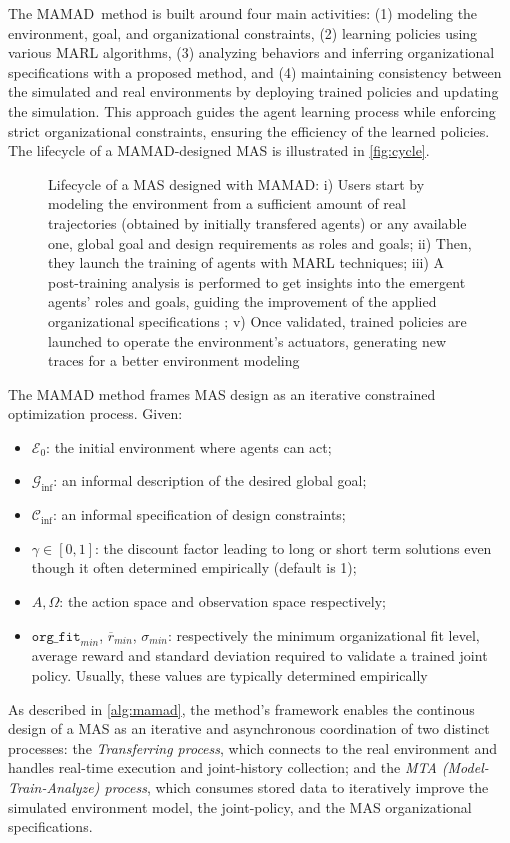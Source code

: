\documentclass[pdflatex,sn-mathphys-num]{sn-jnl}%
\theoremstyle{thmstyleone}%
\theoremstyle{thmstyletwo}%
\theoremstyle{thmstylethree}%
\begin{document}
The MAMAD~\footnotemark[1] method is built around four main activities: (1) modeling the environment, goal, and organizational constraints, (2) learning policies using various MARL algorithms, (3) analyzing behaviors and inferring organizational specifications with a proposed method, and (4) maintaining consistency between the simulated and real environments by deploying trained policies and updating the simulation. This approach guides the agent learning process while enforcing strict organizational constraints, ensuring the efficiency of the learned policies. The lifecycle of a MAMAD-designed MAS is illustrated in \autoref{fig:cycle}.
%
\begin{figure}[h!]
    \centering
    
    \caption{Lifecycle of a MAS designed with MAMAD: i) Users start by modeling the environment from a sufficient amount of real trajectories (obtained by initially transfered agents) or any available one, global goal and design requirements as roles and goals; \quad ii) Then, they launch the training of agents with MARL techniques; \quad iii) A post-training analysis is performed to get insights into the emergent agents' roles and goals, guiding the improvement of the applied organizational specifications ; \quad v) Once validated, trained policies are launched to operate the environment's actuators, generating new traces for a better environment modeling}
    \label{fig:cycle}
\end{figure}
%
The MAMAD method frames MAS design as an iterative constrained optimization process. Given:
\begin{itemize}
    \item $\mathcal{E}_0$: the initial environment where agents can act;
    \item $\mathcal{G}_{\text{inf}}$: an informal description of the desired global goal;
    \item $\mathcal{C}_{\text{inf}}$: an informal specification of design constraints;
    \item $\gamma \in [0,1]$: the discount factor leading to long or short term solutions even though it often determined empirically (default is 1);
    \item $A, \Omega$: the action space and observation space respectively;
    \item $\texttt{org\_fit}_{min}$, $\overline{r}_{min}$, $\sigma_{min}$: respectively the minimum organizational fit level, average reward and standard deviation required to validate a trained joint policy. Usually, these values are typically determined empirically
\end{itemize}
%
\noindent As described in \autoref{alg:mamad}, the method's framework enables the continous design of a MAS as an iterative and asynchronous coordination of two distinct processes: the \textit{Transferring process}, which connects to the real environment and handles real-time execution and joint-history collection; and the \textit{MTA (Model-Train-Analyze) process}, which consumes stored data to iteratively improve the simulated environment model, the joint-policy, and the MAS organizational specifications.
\end{document}
